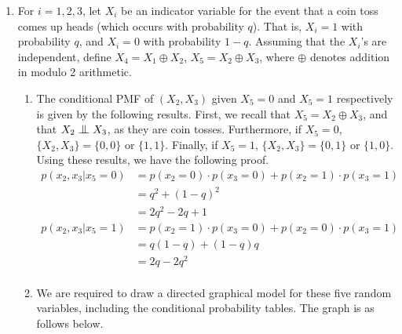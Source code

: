 \documentclass[a4paper]{article}
\newcommand{\indep}{\mathrel{\text{\scalebox{1.07}{$\perp\mkern-10mu\perp$}}}}
\begin{document}
\begin{enumerate}[label=\textbf{\arabic*.}]
\begin{enumerate}
	\end{enumerate}

	\pagebreak

	\item For $\displaystyle{i = 1,2,3}$, let $\displaystyle{X_i}$ be an indicator variable for the event that a coin toss comes up heads (which occurs with probability $\displaystyle{q}$). That is, $\displaystyle{X_i = 1}$ with probability $\displaystyle{q}$, and $\displaystyle{X_i = 0}$ with probability $\displaystyle{1-q}$. Assuming that the $\displaystyle{X_i}$'s are independent, define $\displaystyle{X_4 = X_1 \oplus X_2}$, $\displaystyle{X_5 = X_2 \oplus X_3}$, where $\displaystyle{\oplus}$ denotes addition in modulo 2 arithmetic.

	\begin{enumerate}
		\item The conditional PMF of $\displaystyle{(X_2,X_3)}$ given $\displaystyle{X_5 = 0}$ and $\displaystyle{X_5 = 1}$ respectively is given by the following results. First, we recall that $\displaystyle{X_5 = X_2 \oplus X_3}$, and that $\displaystyle{X_2 \indep X_3}$, as they are coin tosses. Furthermore, if $\displaystyle{X_5 = 0}$, $\displaystyle{\{X_2,X_3\} = \{0,0\}}$ or $\displaystyle{\{1,1\}}$. Finally, if $\displaystyle{X_5 = 1}$, $\displaystyle{\{X_2,X_3\} = \{0,1\}}$ or $\displaystyle{\{1,0\}}$. Using these results, we have the following proof.
		\begin{align*}
		p(x_2,x_3|x_5 = 0) & = p(x_2 = 0)\cdot p(x_3 = 0) + p(x_2 = 1)\cdot p(x_3 = 1) \\
		& = q^2 + (1-q)^2 \\
		& = 2q^2 - 2q + 1 \\
		p(x_2,x_3|x_5 = 1) & = p(x_2 = 1)\cdot p(x_3 = 0) + p(x_2 = 0)\cdot p(x_3 = 1) \\
		& = q(1-q) + (1-q)q \\
		& = 2q - 2q^2 \\
		\end{align*}

		\item We are required to draw a directed graphical model for these five random variables, including the conditional probability tables. The graph is as follows below.

		\bigbreak

		\begin{center}
\end{center}
\end{enumerate}
\end{enumerate}
\end{document}
